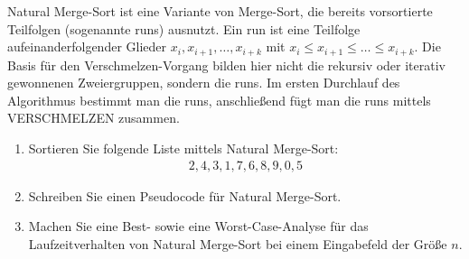 
\begin{exercise}

Natural Merge-Sort ist eine Variante von Merge-Sort, die bereits vorsortierte Teilfolgen
(sogenannte runs) ausnutzt. Ein run ist eine Teilfolge aufeinanderfolgender Glieder $x_i, x_{i+1}, \dots, x_{i+k}$ mit $x_i \leq x_{i+1} \leq \dots \leq x_{i+k}$. Die Basis für den Verschmelzen-Vorgang bilden hier nicht
die rekursiv oder iterativ gewonnenen Zweiergruppen, sondern die runs. Im ersten Durchlauf des Algorithmus
bestimmt man die runs, anschließend fügt man die runs mittels VERSCHMELZEN zusammen.

\begin{enumerate}[label = (\alph*)]
  \item Sortieren Sie folgende Liste mittels Natural Merge-Sort:
  \begin{align}
    2,4,3,1,7,6,8,9,0,5
  \end{align}
  \item Schreiben Sie einen Pseudocode für Natural Merge-Sort.
  \item Machen Sie eine Best- sowie eine Worst-Case-Analyse für das Laufzeitverhalten von Natural Merge-Sort
  bei einem Eingabefeld der Größe $n$.
\end{enumerate}
\end{exercise}

